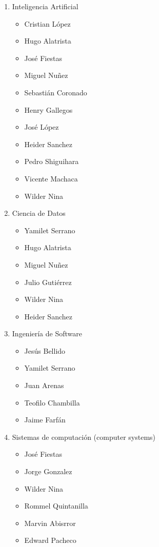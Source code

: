 \documentclass[12pt]{extarticle}
\begin{document}
\begin{enumerate}
\item Inteligencia Artificial
\begin{itemize}
\item Cristian López
\item Hugo Alatrista
\item José Fiestas
\item Miguel Nuñez
\item Sebastián Coronado
\item Henry Gallegos
\item José López
\item Heider Sanchez
\item Pedro Shiguihara
\item Vicente Machaca
\item Wilder Nina
\end{itemize}

\item Ciencia de Datos
\begin{itemize}
\item Yamilet Serrano 
\item Hugo Alatrista 
\item Miguel Nuñez
\item Julio Gutiérrez
\item Wilder Nina
\item Heider Sanchez
\end{itemize}

\item Ingeniería de Software
\begin{itemize}
\item Jesús Bellido
\item Yamilet Serrano 
\item Juan Arenas
\item Teofilo Chambilla 
\item Jaime Farfán
\end{itemize}

\item Sistemas de computación (computer systems)		
\begin{itemize}
\item José Fiestas
\item Jorge Gonzalez
\item Wilder Nina
\item Rommel Quintanilla
\item Marvin Abisrror
\item Edward Pacheco
\end{itemize}


\end{enumerate}
\end{document}
